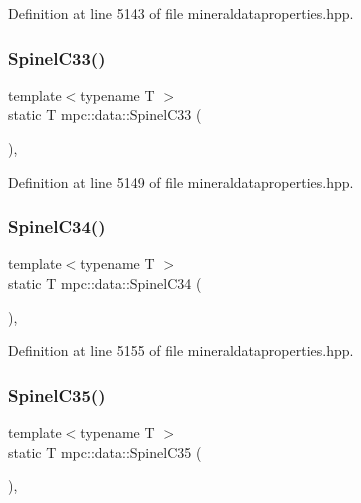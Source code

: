 Definition at line 5143 of file mineraldataproperties.\+hpp.

\mbox{\label{namespacempc_1_1data_abaa9a86c3126106021b32316c10b3c4d}} 
\subsubsection{\texorpdfstring{Spinel\+C33()}{SpinelC33()}}
{\footnotesize\ttfamily template$<$typename T $>$ \\
static T mpc\+::data\+::\+Spinel\+C33 (\begin{DoxyParamCaption}{ }\end{DoxyParamCaption})\hspace{0.3cm}{\ttfamily [inline]}, {\ttfamily [static]}}



Definition at line 5149 of file mineraldataproperties.\+hpp.

\mbox{\label{namespacempc_1_1data_a6e6007ab3acf15f9566f89cbd47d2a4a}} 
\subsubsection{\texorpdfstring{Spinel\+C34()}{SpinelC34()}}
{\footnotesize\ttfamily template$<$typename T $>$ \\
static T mpc\+::data\+::\+Spinel\+C34 (\begin{DoxyParamCaption}{ }\end{DoxyParamCaption})\hspace{0.3cm}{\ttfamily [inline]}, {\ttfamily [static]}}



Definition at line 5155 of file mineraldataproperties.\+hpp.

\mbox{\label{namespacempc_1_1data_a08aa2ea2c9ed8d97d847ff986f6a7ed3}} 
\subsubsection{\texorpdfstring{Spinel\+C35()}{SpinelC35()}}
{\footnotesize\ttfamily template$<$typename T $>$ \\
static T mpc\+::data\+::\+Spinel\+C35 (\begin{DoxyParamCaption}{ }\end{DoxyParamCaption})\hspace{0.3cm}{\ttfamily [inline]}, {\ttfamily [static]}}



